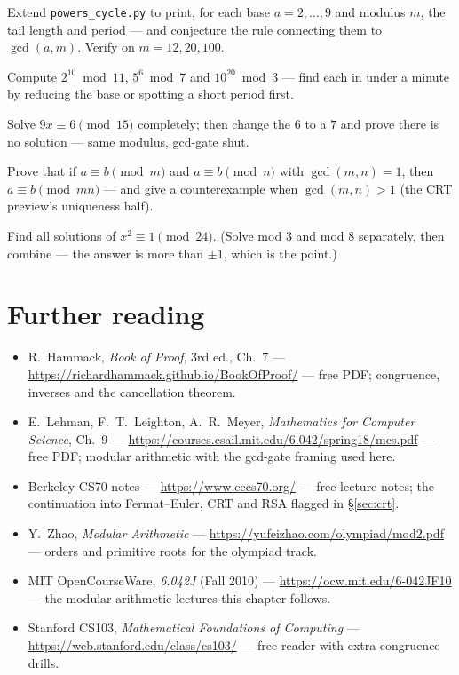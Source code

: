 \begin{exercise}[hard]
Extend \texttt{powers\_cycle.py} to print, for each base $a = 2,\dots,9$
and modulus $m$, the tail length and period --- and conjecture the rule
connecting them to $\gcd(a,m)$. Verify on $m = 12, 20, 100$.
\end{exercise}
\begin{exercise}[easy]
Compute $2^{10} \bmod 11$, $5^{6} \bmod 7$ and $10^{20} \bmod 3$ ---
find each in under a minute by reducing the base or spotting a short
period first.
\end{exercise}
\begin{exercise}[medium]
Solve $9x \equiv 6 \pmod{15}$ completely; then change the $6$ to a $7$ and
prove there is no solution --- same modulus, gcd-gate shut.
\end{exercise}
\begin{exercise}[medium]
Prove that if $a \equiv b \pmod m$ and $a \equiv b \pmod n$ with
$\gcd(m,n) = 1$, then $a \equiv b \pmod{mn}$ --- and give a counterexample
when $\gcd(m,n) > 1$ (the CRT preview's uniqueness half).
\end{exercise}
\begin{exercise}[hard]
Find all solutions of $x^2 \equiv 1 \pmod{24}$. (Solve mod $3$ and mod $8$
separately, then combine --- the answer is more than $\pm 1$, which is the
point.)
\end{exercise}

\section*{Further reading}
\begin{itemize}
\item R.~Hammack, \emph{Book of Proof}, 3rd ed., Ch.~7 ---
\url{https://richardhammack.github.io/BookOfProof/} --- free PDF;
congruence, inverses and the cancellation theorem.
\item E.~Lehman, F.~T.~Leighton, A.~R.~Meyer, \emph{Mathematics for
Computer Science}, Ch.~9 ---
\url{https://courses.csail.mit.edu/6.042/spring18/mcs.pdf} --- free PDF;
modular arithmetic with the gcd-gate framing used here.
\item Berkeley CS70 notes ---
\url{https://www.eecs70.org/} --- free lecture notes; the continuation
into Fermat--Euler, CRT and RSA flagged in \S\ref{sec:crt}.
\item Y.~Zhao, \emph{Modular Arithmetic} ---
\url{https://yufeizhao.com/olympiad/mod2.pdf} --- orders and primitive
roots for the olympiad track.
\item MIT OpenCourseWare, \emph{6.042J} (Fall 2010) ---
\url{https://ocw.mit.edu/6-042JF10} --- the modular-arithmetic lectures
this chapter follows.
\item Stanford CS103, \emph{Mathematical Foundations of Computing} ---
\url{https://web.stanford.edu/class/cs103/} --- free reader with extra
congruence drills.
\end{itemize}

